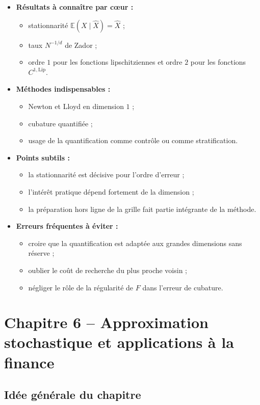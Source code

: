 \documentclass[11pt,a4paper]{article}
\newcommand{\E}{\mathbb{E}}
\newcommand{\Lip}{\mathrm{Lip}}
\begin{document}
\begin{itemize}
  \item \textbf{Résultats à connaître par cœur :}
  \begin{itemize}
    \item stationnarité $\E(X\mid \hat X)=\hat X$ ;
    \item taux $N^{-1/d}$ de Zador ;
    \item ordre $1$ pour les fonctions lipschitziennes et ordre $2$ pour les fonctions $C^{1,\Lip}$.
  \end{itemize}
  \item \textbf{Méthodes indispensables :}
  \begin{itemize}
    \item Newton et Lloyd en dimension $1$ ;
    \item cubature quantifiée ;
    \item usage de la quantification comme contrôle ou comme stratification.
  \end{itemize}
  \item \textbf{Points subtils :}
  \begin{itemize}
    \item la stationnarité est décisive pour l'ordre d'erreur ;
    \item l'intérêt pratique dépend fortement de la dimension ;
    \item la préparation hors ligne de la grille fait partie intégrante de la méthode.
  \end{itemize}
  \item \textbf{Erreurs fréquentes à éviter :}
  \begin{itemize}
    \item croire que la quantification est adaptée aux grandes dimensions sans réserve ;
    \item oublier le coût de recherche du plus proche voisin ;
    \item négliger le rôle de la régularité de $F$ dans l'erreur de cubature.
  \end{itemize}
\end{itemize}

\section{Chapitre 6 -- Approximation stochastique et applications à la finance}

\subsection{Idée générale du chapitre}
\end{document}
